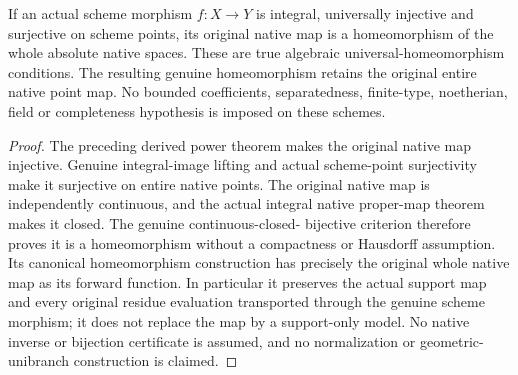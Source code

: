 \begin{theorem}
\label{scheme:integral-surjective-native-homeomorphism}
\leanok
{}
If an actual scheme morphism $f:X\to Y$ is integral, universally
injective and surjective on scheme points, its original native map is
a homeomorphism of the whole absolute native spaces. These are true
algebraic universal-homeomorphism conditions. The resulting genuine
homeomorphism retains the original entire native point map.
No bounded coefficients, separatedness, finite-type, noetherian,
field or completeness hypothesis is imposed on these schemes.
\end{theorem}
\begin{proof}
The preceding derived power theorem makes the original native map
injective. Genuine integral-image lifting and actual scheme-point
surjectivity make it surjective on entire native points. The original
native map is independently continuous, and the actual integral native
proper-map theorem makes it closed. The genuine continuous-closed-
bijective criterion therefore proves it is a homeomorphism without a
compactness or Hausdorff assumption. Its canonical homeomorphism
construction has precisely the original whole native map as its
forward function. In particular it preserves the actual support map
and every original residue evaluation transported through the genuine
scheme morphism; it does not replace the map by a support-only model.
No native inverse or bijection certificate is assumed, and no
normalization or geometric-unibranch construction is claimed.
\end{proof}

